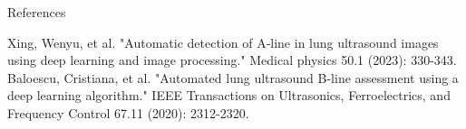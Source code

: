 \documentclass{beamer}
\begin{document}
\begin{frame}{References}
    \begin{thebibliography}{99}
         Xing, Wenyu, et al. "Automatic detection of A‐line in lung ultrasound images using deep learning and image processing." Medical physics 50.1 (2023): 330-343.
	 Baloescu, Cristiana, et al. "Automated lung ultrasound B-line assessment using a deep learning algorithm." IEEE Transactions on Ultrasonics, Ferroelectrics, and Frequency Control 67.11 (2020): 2312-2320.
    \end{thebibliography}
\end{frame}
\end{document}
